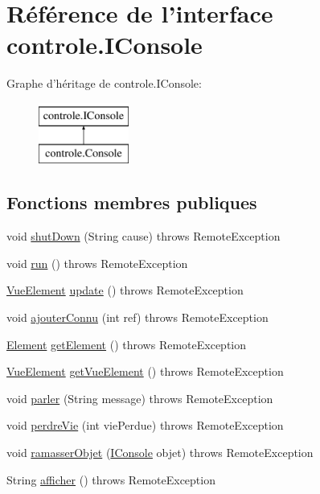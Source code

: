 \hypertarget{interfacecontrole_1_1_i_console}{\section{Référence de l'interface controle.\-I\-Console}
\label{interfacecontrole_1_1_i_console}
}
Graphe d'héritage de controle.\-I\-Console\-:\begin{figure}[H]
\begin{center}
\leavevmode
\includegraphics[height=2.000000cm]{interfacecontrole_1_1_i_console}
\end{center}
\end{figure}
\subsection*{Fonctions membres publiques}
\begin{DoxyCompactItemize}
\item 
void \hyperlink{interfacecontrole_1_1_i_console_a77e327568514ec7eed8161c6b73e4d9a}{shut\-Down} (String cause)  throws Remote\-Exception
\item 
void \hyperlink{interfacecontrole_1_1_i_console_afb2a3e548fe438ac7af6bc429fc84132}{run} ()  throws Remote\-Exception
\item 
\hyperlink{classinterface_graphique_1_1_vue_element}{Vue\-Element} \hyperlink{interfacecontrole_1_1_i_console_ab6728a4bf807f04e5d13bfd452a69bc2}{update} ()  throws Remote\-Exception
\item 
void \hyperlink{interfacecontrole_1_1_i_console_ac0aefd004a73641f8ba6ef57266c0508}{ajouter\-Connu} (int ref)  throws Remote\-Exception
\item 
\hyperlink{classindividu_1_1_element}{Element} \hyperlink{interfacecontrole_1_1_i_console_a0cde95415052505230b482a2b5fed5fd}{get\-Element} ()  throws Remote\-Exception
\item 
\hyperlink{classinterface_graphique_1_1_vue_element}{Vue\-Element} \hyperlink{interfacecontrole_1_1_i_console_a5fc11711131f9a99768d36bffc695535}{get\-Vue\-Element} ()  throws Remote\-Exception
\item 
void \hyperlink{interfacecontrole_1_1_i_console_ab200b6a49e88391691be5df49cfa36f2}{parler} (String message)  throws Remote\-Exception
\item 
void \hyperlink{interfacecontrole_1_1_i_console_ace6ee762b3f067e26f478066a9c1283f}{perdre\-Vie} (int vie\-Perdue)  throws Remote\-Exception
\item 
void \hyperlink{interfacecontrole_1_1_i_console_a90d8826ee94075bc55a52779a0257b85}{ramasser\-Objet} (\hyperlink{interfacecontrole_1_1_i_console}{I\-Console} objet)  throws Remote\-Exception
\item 
String \hyperlink{interfacecontrole_1_1_i_console_a6166aa60251707f3c095e8e197a88dac}{afficher} ()  throws Remote\-Exception
\end{DoxyCompactItemize}


